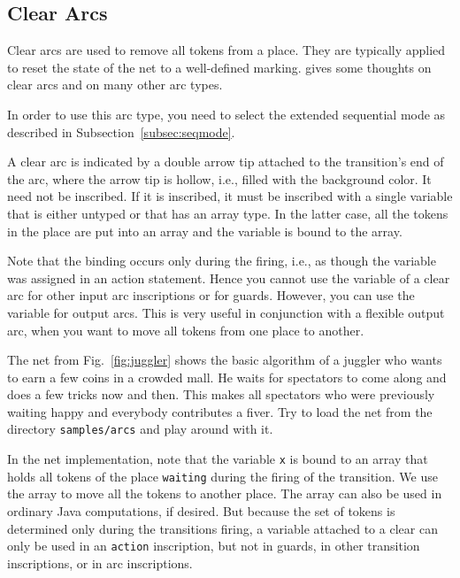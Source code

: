

\subsection{Clear Arcs}\label{subsec:clearArcs}

Clear arcs are used to remove all tokens from
a place. They are typically applied to reset the state
of the net to a well-defined marking.
\cite{LC94} gives some thoughts on clear arcs
and on many other arc types.

In order to use this arc type, you need to select the
extended sequential mode as described in
Subsection~\ref{subsec:seqmode}.

A clear arc is indicated by a double arrow tip attached
to the transition's end of the arc, where the arrow tip
is hollow, i.e., filled with the background color. It
need not be inscribed. If it is inscribed,
it must be inscribed with a single variable that is
either untyped or that has an array type. In the latter case,
all the tokens in the place are put into an array
and the variable is bound to the array.

Note that
the binding occurs only during the firing, i.e., as though
the variable was assigned in an action statement.
Hence you cannot use the variable of a clear arc for
other input arc inscriptions or for guards.
However, you can use the variable for output arcs.
This is very useful in conjunction with a flexible
output arc, when you want to move all tokens from
one place to another.

The net from Fig.~\ref{fig:juggler} shows the basic
algorithm of a juggler who wants to earn a few coins
in a crowded mall. He waits for spectators to come along
and does a few tricks now and then. This makes all
spectators who were previously waiting happy and
everybody contributes a fiver. Try to load the net from
the directory \texttt{samples/arcs} and play around with it.

In the net implementation, note that the variable \texttt{x}
is bound to an array that holds all tokens of the place
\texttt{waiting} during the firing of the transition.
We use the array to move all the tokens to another place.
The array can also be used in ordinary Java computations,
if desired. But because the set of tokens is determined only
during the transitions firing,
a variable attached to a clear can only be used
in an \texttt{action} inscription, but not in guards, in other transition
inscriptions, or in arc inscriptions.

